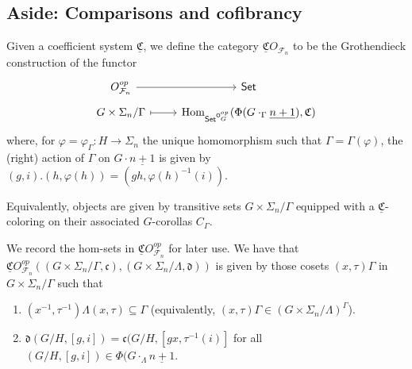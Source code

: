 \documentclass[a4paper,10pt
]{article}%
\renewcommand{\phi}{\varphi}
\newcommand{\UC}{\underline{\mathfrak C}}
\renewcommand{\F}{\mathcal F}
\renewcommand{\1}{\ensuremath{\mathbb{id}}}
\begin{document}
\newpage

\subsection{Aside: Comparisons and cofibrancy}



\begin{definition}
      Given a coefficient system $\UC$, we define the category $\UC O_{\F_n}$ to be the Grothendieck construction of the functor
      \begin{equation}
            \begin{tikzcd}[row sep = tiny]
                  O_{\F_n}^{op} \arrow[r]
                  &
                  \Set
                  \\
                  G \times \Sigma_n / \Gamma \arrow[r, mapsto]
                  &
                  \Hom_{\Set^{\mathsf O_G^{op}}}(\Phi(G \cdot_\Gamma \underline{n+1}), \mathfrak C)
            \end{tikzcd}
      \end{equation}
      where, for $\phi = \phi_\Gamma: H \to \Sigma_n$ the unique homomorphism such that $\Gamma = \Gamma(\phi)$,
      the (right) action of $\Gamma$ on $G \cdot \underline{n+1}$ is given by
      $(g,i).(h,\phi(h)) = (gh, \phi(h)^{-1}(i))$.
\end{definition}

Equivalently, objects are given by transitive sets $G \times \Sigma_n / \Gamma$
equipped with a $\UC$-coloring on their associated $G$-corollas $C_\Gamma$.

\begin{remark}
      We record the hom-sets in $\UC O_{\F_n}^{op}$ for later use. We have that
      \mbox{$\UC O_{\F_n}^{op}((G \times \Sigma_n/\Gamma, \mathfrak c), (G \times \Sigma_n / \Lambda, \mathfrak d))$}
      is given by those cosets $(x,\tau)\Gamma$ in $G \times \Sigma_n / \Gamma$ such that
      \begin{enumerate}
      \item $(x^{-1},\tau^{-1})\Lambda(x,\tau) \subseteq \Gamma$
            (equivalently, $(x,\tau)\Gamma \in (G \times \Sigma_n/\Lambda)^\Gamma$).
      \item $\mathfrak d(G/H, [g,i]) = \mathfrak c(G/H, [g x, \tau^{-1}(i)]$
            for all $(G/H, [g,i]) \in \Phi(G \cdot_{\Lambda} \underline{n+1}$.
      \end{enumerate}
\end{remark}
\end{document}
